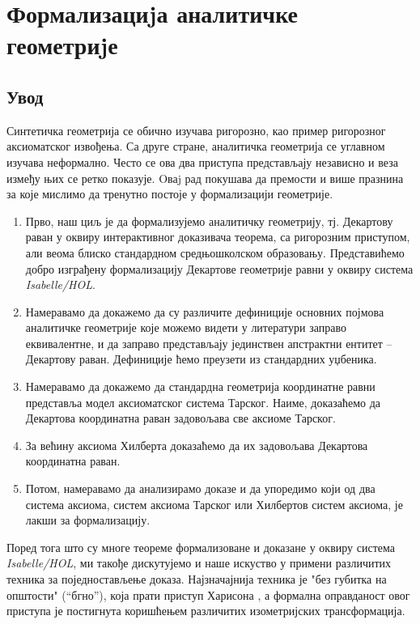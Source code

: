 \chapter{Формализациjа аналитичке геометриjе}
\label{chapter::analiticka}

\section{Увод}

Синтетичка геометрија се обично изучава ригорозно, као пример
ригорозног аксиоматског извођења. Са друге стране, аналитичка
геометрија се углавном изучава неформално. Често се ова два приступа
представљају независно и веза између њих се ретко показује. Oваj рад
покушава да премости и више празнина за које мислимо да тренутно
постоје у формализацији геометрије.

\begin{enumerate}
\item Прво, наш циљ је да формализујемо аналитичку геометрију,
  тј. Де\-ка\-рто\-ву раван у оквиру интерактивног доказивача теорема, са
  ригорозним приступом, али веома блиско стандардном средњошколском
  образовању.  Представићемо добро изграђену формализацију Декартове
  геометрије равни у оквиру система \emph{Isabelle/HOL}.
\item Намеравамо да докажемо да су различите дефиниције основних
  појмова аналитичке геометрије које можемо видети у литератури
  заправо еквивалентне, и да заправо представљају јединствен
  апстрактни ентитет -- Декартову раван.  Дефиниције ћемо преузети из
  стандардних уџбеника.
\item Намеравамо да докажемо да стандардна геометрија координатне равни
  представља модел аксиоматског система Тарског. Наиме, доказаћемо да
  Декартова координатна раван задовољава све аксиоме Тарског.
\item За већину аксиома Хилберта доказаћемо да их задовољава Декартова
  координатна раван.
\item Потом, намеравамо да анализирамо доказе и да упоредимо који од
  два система аксиома, систем аксиома Тарског или Хилбертов систем
  аксиома, је лакши за формализацију.
\end{enumerate}


Поред тога што су многе теореме формализоване и доказане у оквиру
система \emph{Isabelle/HOL}, ми такође дискутујемо и наше искуство у
примени различитих техника за поједностављење доказа.  Најзначајнија
техника је "без губитка на општости" (``бгно''), која прати приступ
Харисона \cite{wlog}, а формална оправданост овог приступа је
постигнута коришћењем различитих изо\-ме\-три\-јских трансформација.



